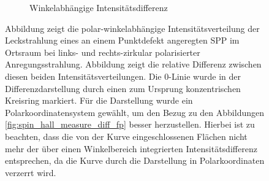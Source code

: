 \documentclass[titlepage,  ngerman]{article}
\begin{document}
\begin{figure}[h]
\begin{subfigure}{0.49\textwidth}
				\caption{Winkelabhängige Intensitätsdifferenz}
				\label{fig:angular_int_diff_fp}
			\end{subfigure}
			\caption[Polarwinkel Auswertung Ortsraum]{Abbildung  zeigt die polar-winkelabhängige Intensitätsverteilung der Leckstrahlung eines an einem Punktdefekt angeregten SPP im Ortsraum bei links- und rechts-zirkular polarisierter Anregungsstrahlung. Abbildung  zeigt die relative Differenz zwischen diesen beiden Intensitätsverteilungen. Die $0$-Linie wurde in der Differenzdarstellung durch einen zum Ursprung konzentrischen Kreisring markiert. Für die Darstellung wurde ein Polarkoordinatensystem gewählt, um den Bezug zu den Abbildungen \ref{fig:spin_hall_measure_diff_fp} besser herzustellen. Hierbei ist zu beachten, dass die von der Kurve eingeschlossenen Flächen nicht mehr der über einen Winkelbereich integrierten Intensitätsdifferenz entsprechen, da die Kurve durch die Darstellung in Polarkoordinaten verzerrt wird.}
			\label{fig:angular_dist_fp}
		\end{figure}
	
		\FloatBarrier
\end{document}

